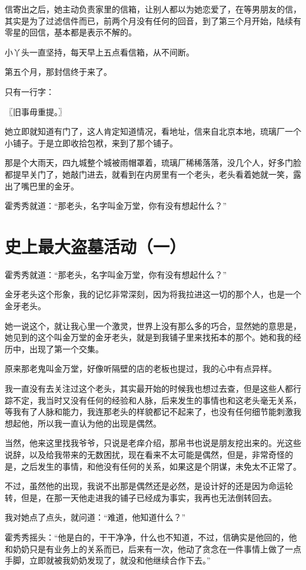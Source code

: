 信寄出之后，她主动负责家里的信箱，让别人都以为她恋爱了，在等男朋友的信，其实是为了过滤信件而已，前两个月没有任何的回音，到了第三个月开始，陆续有零星的回信，基本都是表示不解的。

小丫头一直坚持，每天早上五点看信箱，从不间断。

第五个月，那封信终于来了。

只有一行字：

〖旧事毋重提。〗

她立即就知道有门了，这人肯定知道情况，看地址，信来自北京本地，琉璃厂一个小铺子。于是立即收拾包袱，来到了那个铺子。

那是个大雨天，四九城整个城被雨帽罩着，琉璃厂稀稀落落，没几个人，好多门脸都提早关门了，她敲门进去，就看到在内房里有一个老头，老头看着她就一笑，露出了嘴巴里的金牙。

霍秀秀就道：“那老头，名字叫金万堂，你有没有想起什么？”

\chapter{史上最大盗墓活动（一）}

霍秀秀就道：“那老头，名字叫金万堂，你有没有想起什么？”

金牙老头这个形象，我的记忆非常深刻，因为将我拉进这一切的那个人，也是一个金牙老头。

她一说这个，就让我心里一个激灵，世界上没有那么多的巧合，显然她的意思是，她见到的这个叫金万堂的金牙老头，就是到我铺子里来找拓本的那个。她和我的经历中，出现了第一个交集。

原来那老鬼叫金万堂，好像听隔壁的店的老板也提过，我的心中有点异样。

我一直没有去关注过这个老头，其实最开始的时候我也想过去查，但是这些人都行踪不定，我当时又没有任何的经验和人脉，后来发生的事情也和这老头毫无关系，等我有了人脉和能力，我连那老头的样貌都记不起来了，也没有任何细节能刺激我想起他，所以我一直认为他的出现是偶然。

当然，他来这里找我爷爷，只说是老痒介绍，那帛书也说是朋友挖出来的。光这些说辞，以及给我带来的无数困扰，现在看来不太可能是偶然，但是，非常奇怪的是，之后发生的事情，和他没有任何的关系，如果这是个阴谋，未免太不正常了。

不过，虽然他的出现，我说不出那是偶然还是必然，是设计好的还是因为命运轮转，但是，在那一天他走进我的铺子已经成为事实，我再也无法倒转回去。

我对她点了点头，就问道：“难道，他知道什么？”

霍秀秀摇头：“他是白的，干干净净，什么也不知道，不过，信确实是他回的，他和奶奶只是有业务上的关系而已，后来有一次，他动了贪念在一件事情上做了一点手脚，立即就被我奶奶发现了，就没和他继续合作下去。”

